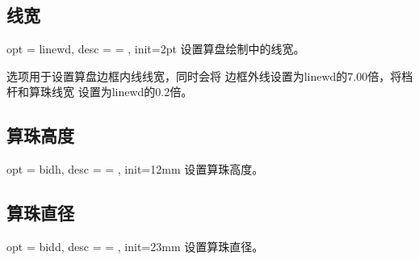 \documentclass[full]{l3doc}
\begin{document}
\begin{documentation}
\subsection{线宽}

\begin{option}{ opt = linewd, desc = {= }, init=2pt }
  设置算盘绘制中的线宽。
\end{option}

  选项用于设置算盘边框内线线宽，同时会将
  边框外线设置为linewd的7.00倍，将档杆和算珠线宽
  设置为linewd的0.2倍。

\begin{SideBySideExample}[frame=single,numbers=left,%
                xrightmargin=.40\linewidth,gobble=2]
  \centering
  \begin{suanpan}
  \end{suanpan}
\end{SideBySideExample}


\subsection{算珠高度}

\begin{option}{ opt = bidh, desc = {= }, init=12mm }
  设置算珠高度。
\end{option}

\begin{SideBySideExample}[frame=single,numbers=left,%
                xrightmargin=.40\linewidth,gobble=2]
  \centering
  \begin{suanpan}
  \end{suanpan}
\end{SideBySideExample}

\subsection{算珠直径}

\begin{option}{ opt = bidd, desc = {= }, init=23mm }
  设置算珠直径。
\end{option}

\begin{SideBySideExample}[frame=single,numbers=left,%
                xrightmargin=.40\linewidth,gobble=2]
  \centering
  \begin{suanpan}
  \end{suanpan}
\end{SideBySideExample}


\end{documentation}
\end{document}
